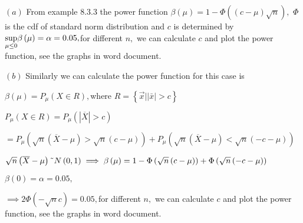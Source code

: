 \documentclass{article}
\begin{document}
$\left( a\right) $ From example 8.3.3 the power function $\beta \left( \mu
\right) =1-\Phi \left( \left( c-\mu \right) \sqrt{n}\right) ,$ $\Phi $ is
the cdf of standard norm distribution and $c$ is determined by $\underset{%
\mu \leq 0}{\sup }\beta \left( \mu \right) =\alpha =0.05,$for different $n,$
we can calculate $c$ and plot the power function, see the graphs in word
document.

$\left( b\right) $ Similarly we can calculate the power function for this
case is 

$\beta \left( \mu \right) =P_{\mu }\left( X\in R\right) ,$where $R=\left\{ 
\vec{x}|\left\vert \bar{x}\right\vert >c\right\} $

$P_{\mu }\left( X\in R\right) =P_{\mu }\left( \left\vert \overline{X}%
\right\vert >c\right) $

$=P_{\mu }\left( \sqrt{n}\left( \overline{X}-\mu \right) >\sqrt{n}\left(
c-\mu \right) \right) +P_{\mu }\left( \sqrt{n}\left( \overline{X}-\mu
\right) <\sqrt{n}\left( -c-\mu \right) \right) $

$\sqrt{n}\left( \overline{X}-\mu \right) \symbol{126}N\left( 0,1\right)
\implies \beta \left( \mu \right) =1-\Phi \left( \sqrt{n}\left( c-\mu
\right) \right) +\Phi \left( \sqrt{n}\left( -c-\mu \right) \right) $

$\beta \left( 0\right) =\alpha =0.05,$

$\implies 2\Phi \left( -\sqrt{n}c\right) =0.05,$for different $n,$ we can
calculate $c$ and plot the power function, see the graphs in word document.
\end{document}
